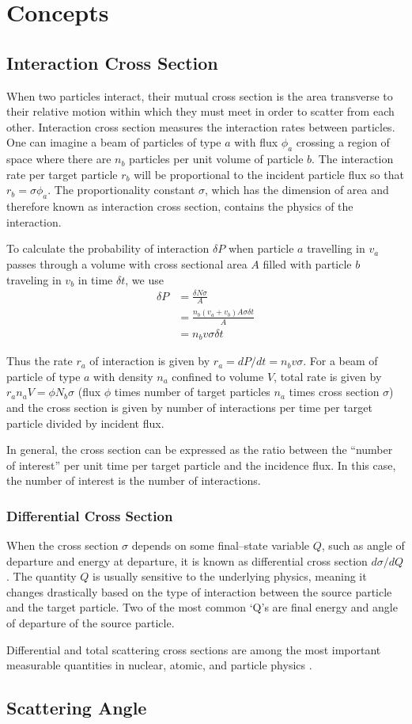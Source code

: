 \chapter{Concepts}\label{sec:concepts}
\section{Interaction Cross Section}
When two particles interact, their mutual cross section is the area transverse to their relative motion within which they must meet in order to scatter from each other. Interaction cross section measures the interaction rates between particles. One can imagine a beam of particles of type $a$ with flux $\phi_a$ crossing a region of space where there are $n_b$ particles per unit volume of particle $b$. The interaction rate per target particle $r_b$ will be proportional to the incident particle flux so that $r_b=\sigma\phi_a$. The proportionality constant $\sigma$, which has the dimension of area and therefore known as interaction cross section, contains the physics of the interaction.

To calculate the probability of interaction $\delta P$ when particle $a$ travelling in $v_a$ passes through a volume with cross sectional area $A$ filled with particle $b$ traveling in $v_b$ in time $\delta t$, we use
\begin{align*}
    \delta P
    &= \frac{\delta N \sigma}{A} \\
    &= \frac{n_b(v_a+v_b)A\sigma \delta t}{A} \\
    &= n_bv\sigma\delta t
\end{align*}

Thus the rate $r_a$ of interaction is given by $r_a=dP/dt=n_b v\sigma$. For a beam of particle of type $a$ with density $n_a$ confined to volume $V$, total rate is given by $r_a n_a V=\phi N_b\sigma$ (flux $\phi$ times number of target particles $n_a$ times cross section $\sigma$) and the cross section is given by number of interactions per time per target particle divided by incident flux.

In general, the cross section can be expressed as the ratio between the ``number of interest'' per unit time per target particle and the incidence flux. In this case, the number of interest is the number of interactions.

\subsection{Differential Cross Section}
When the cross section $\sigma$ depends on some final--state variable $Q$, such as angle of departure and energy at departure, it is known as differential cross section $d\sigma /dQ$. The quantity $Q$ is usually sensitive to the underlying physics, meaning it changes drastically based on the type of interaction between the source particle and the target particle. Two of the most common `Q's are final energy and angle of departure of the source particle.

Differential and total scattering cross sections are among the most important measurable quantities in nuclear, atomic, and particle physics \cite{dcs}.

\section{Scattering Angle}

